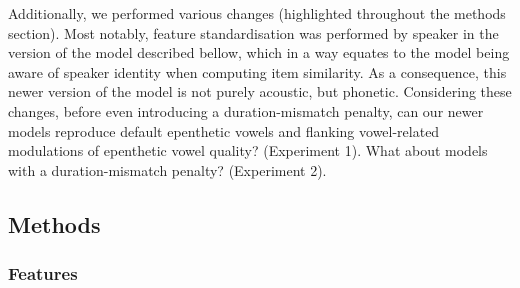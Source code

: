 Additionally, we performed various changes (highlighted throughout the methods section). Most notably, feature standardisation was performed by speaker in the version of the model described bellow, which in a way equates to the model being aware of speaker identity when computing item similarity. As a consequence, this newer version of the model is not purely acoustic, but phonetic. Considering these changes, before even introducing a duration-mismatch penalty, can our newer models reproduce default epenthetic vowels and flanking vowel-related modulations of epenthetic vowel quality? (Experiment 1). What about models with a duration-mismatch penalty? (Experiment 2).    

\subsection{Methods}
\subsubsection{Features}



